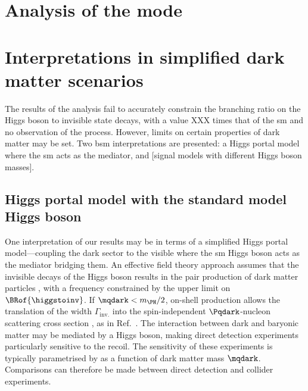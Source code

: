 \section{Analysis of the \texorpdfstring{\ggF}{ggF} mode}
\label{sec:htoinv_analysis_ggF}





\section{Interpretations in simplified dark matter scenarios}
\label{sec:htoinv_dark_matter_models}

The results of the analysis fail to accurately constrain the branching ratio on the Higgs boson to invisible state decays, with a value XXX times that of the \acrlong{sm} and no observation of the process. However, limits on certain properties of dark matter may be set. Two \acrshort{bsm} interpretations are presented: a Higgs portal model where the \acrshort{sm} acts as the mediator, and [signal models with different Higgs boson masses].




\subsection{Higgs portal model with the standard model Higgs boson}
\label{subsec:htoinv_dark_matter_higgs_portal}


One interpretation of our results may be in terms of a simplified Higgs portal model---coupling the dark sector to the visible where the \acrshort{sm} Higgs boson acts as the mediator bridging them. An effective field theory approach assumes that the invisible decays of the Higgs boson results in the pair production of dark matter particles \Pqdark, with a frequency constrained by the upper limit on $\BRof{\higgstoinv}$. If $\mqdark < m_{\PH}/\text{2}$, on-shell production allows the translation of the \higgstoinv width $\Gamma_{\mathrm{inv.}}$ into the spin-independent $\Pqdark$-nucleon scattering cross section \xsecSI, as in Ref.~. The interaction between dark and baryonic matter may be mediated by a Higgs boson, making direct detection experiments particularly sensitive to the recoil. The sensitivity of these experiments is typically parametrised by \xsecSI as a function of dark matter mass $\mqdark$. Comparisons can therefore be made between direct detection and collider experiments.

